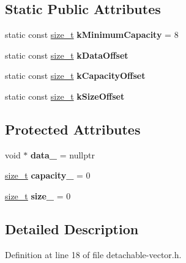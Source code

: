 \subsection*{Static Public Attributes}
\begin{DoxyCompactItemize}
\item 
\mbox{\label{classv8_1_1internal_1_1DetachableVectorBase_a36b0c5f5ababc71b0f46848ece1b3cd2}} 
static const \mbox{\hyperlink{classsize__t}{size\+\_\+t}} {\bfseries k\+Minimum\+Capacity} = 8
\item 
static const \mbox{\hyperlink{classsize__t}{size\+\_\+t}} {\bfseries k\+Data\+Offset}
\item 
static const \mbox{\hyperlink{classsize__t}{size\+\_\+t}} {\bfseries k\+Capacity\+Offset}
\item 
static const \mbox{\hyperlink{classsize__t}{size\+\_\+t}} {\bfseries k\+Size\+Offset}
\end{DoxyCompactItemize}
\subsection*{Protected Attributes}
\begin{DoxyCompactItemize}
\item 
\mbox{\label{classv8_1_1internal_1_1DetachableVectorBase_af16a9c0f0d727fa869eaa8261d80e0fb}} 
void $\ast$ {\bfseries data\+\_\+} = nullptr
\item 
\mbox{\label{classv8_1_1internal_1_1DetachableVectorBase_afc198f268253e1ec4360cb3229595f55}} 
\mbox{\hyperlink{classsize__t}{size\+\_\+t}} {\bfseries capacity\+\_\+} = 0
\item 
\mbox{\label{classv8_1_1internal_1_1DetachableVectorBase_ad26d69ca039f13303067eab6be0f2ece}} 
\mbox{\hyperlink{classsize__t}{size\+\_\+t}} {\bfseries size\+\_\+} = 0
\end{DoxyCompactItemize}


\subsection{Detailed Description}


Definition at line 18 of file detachable-\/vector.\+h.



